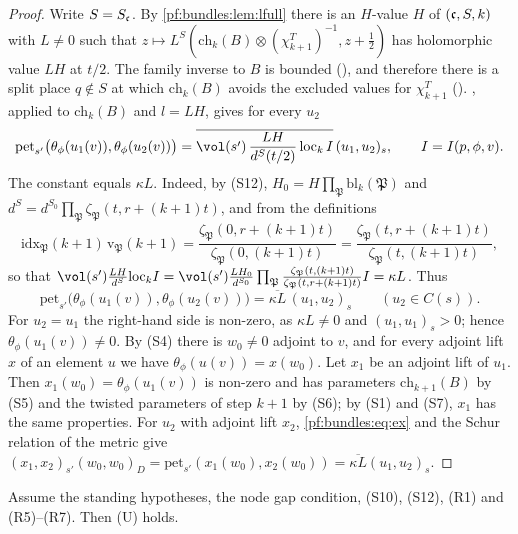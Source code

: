 \begin{proof}
Write $S=S_\mathfrak c$. By \cref{pf:bundles:lem:lfull} there is an $H$-value $H$ of $(\mathfrak c,S,k)$ with $L\ne0$ such that
$z\mapsto L^S(\mathrm{ch}_k(B)\otimes(\chi^T_{k+1})^{-1},z+\frac12)$ has holomorphic value $LH$ at $t/2$. The family inverse to $B$ is bounded
(), and therefore there is a split place $q\notin S$ at which $\mathrm{ch}_k(B)$ avoids the excluded
values for $\chi^T_{k+1}$ (). , applied to
$\mathrm{ch}_k(B)$ and $l=LH$, gives for every $u_2$
\[
\mathrm{pet}_{s'}\bigl(\theta_\phi(u_1(v)),\theta_\phi(u_2(v))\bigr)=\overline{\vol(s')\,\frac{LH}{d^S(t/2)}\,\mathrm{loc}_k\,I}\,(u_1,u_2)_s,
\qquad I=I(p,\phi,v).
\]
The constant equals $\kappa L$. Indeed, by (S12), $H_0=H\prod_{\mathfrak P}\mathrm{bl}_k(\mathfrak P)$ and $d^S=d^{S_0}\prod_{\mathfrak
P}\zeta_{\mathfrak P}(t,r+(k+1)t)$, and from the definitions
\[
\mathrm{idx}_{\mathfrak P}(k+1)\,\mathrm v_{\mathfrak P}(k+1)=\frac{\zeta_{\mathfrak P}(0,r+(k+1)t)}{\zeta_{\mathfrak P}(0,(k+1)t)}=
\frac{\zeta_{\mathfrak P}(t,r+(k+1)t)}{\zeta_{\mathfrak P}(t,(k+1)t)},
\]
so that $\vol(s')\frac{LH}{d^S}\mathrm{loc}_kI=\vol(s')\frac{LH_0}{d^{S_0}}\prod_{\mathfrak P}\frac{\zeta_{\mathfrak P}(t,(k+1)t)}{\zeta_{\mathfrak
P}(t,r+(k+1)t)}I=\kappa L$. Thus
\begin{equation}\label{pf:bundles:eq:ex}
\mathrm{pet}_{s'}\bigl(\theta_\phi(u_1(v)),\theta_\phi(u_2(v))\bigr)=\overline{\kappa L}\,(u_1,u_2)_s\qquad(u_2\in C(s)).
\end{equation}
For $u_2=u_1$ the right-hand side is non-zero, as $\kappa L\ne0$ and $(u_1,u_1)_s>0$; hence $\theta_\phi(u_1(v))\ne0$. By (S4) there is
$w_0\ne0$ adjoint to $v$, and for every adjoint lift $x$ of an element $u$ we have $\theta_\phi(u(v))=x(w_0)$. Let $x_1$ be an adjoint lift of $u_1$.
Then $x_1(w_0)=\theta_\phi(u_1(v))$ is non-zero and has parameters $\mathrm{ch}_{k+1}(B)$ by (S5) and the twisted parameters of step $k+1$ by (S6);
by (S1) and (S7), $x_1$ has the same properties. For $u_2$ with adjoint lift $x_2$, \eqref{pf:bundles:eq:ex} and the Schur relation of the
metric give $(x_1,x_2)_{s'}(w_0,w_0)_D=\mathrm{pet}_{s'}(x_1(w_0),x_2(w_0))=\overline{\kappa L}(u_1,u_2)_s$.
\end{proof}

\begin{lemma}\label{pf:bundles:lem:unif}
Assume the standing hypotheses, the node gap condition, (S10), (S12), (R1) and (R5)--(R7). Then (U) holds.
\end{lemma}


